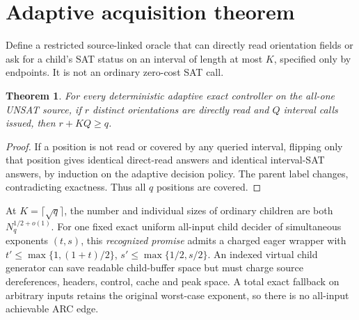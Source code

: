 \documentclass{article}
\newtheorem{theorem}{Theorem}
\begin{document}
\section{Adaptive acquisition theorem}
Define a restricted source-linked oracle that can directly read orientation fields or ask for a child's SAT status on an interval of length at most $K$, specified only by endpoints. It is not an ordinary zero-cost SAT call.
\begin{theorem}
For every deterministic adaptive exact controller on the all-one UNSAT source, if $r$ distinct orientations are directly read and $Q$ interval calls issued, then $r+KQ\ge q$.
\end{theorem}
\begin{proof}If a position is not read or covered by any queried interval, flipping only that position gives identical direct-read answers and identical interval-SAT answers, by induction on the adaptive decision policy. The parent label changes, contradicting exactness. Thus all $q$ positions are covered.\end{proof}
At $K=\lceil\sqrt q\rceil$, the number and individual sizes of ordinary children are both $N_q^{1/2+o(1)}$. For one fixed exact uniform all-input child decider of simultaneous exponents $(t,s)$, this \emph{recognized promise} admits a charged eager wrapper with $t'\le\max\{1,(1+t)/2\}$, $s'\le\max\{1/2,s/2\}$. An indexed virtual child generator can save readable child-buffer space but must charge source dereferences, headers, control, cache and peak space. A total exact fallback on arbitrary inputs retains the original worst-case exponent, so there is no all-input achievable ARC edge.
\end{document}
